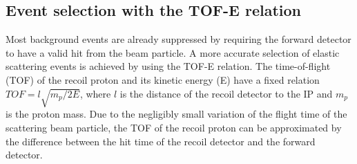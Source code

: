 \documentclass[number,5p]{elsarticle}
\begin{document}
\subsection{Event selection with the TOF-E relation}
\label{sec:tofe_selection}

Most background events are already suppressed by requiring the forward detector to have a valid hit from the beam particle.
A more accurate selection of elastic scattering events is achieved by using the TOF-E relation.
The time-of-flight (TOF) of the recoil proton and its kinetic energy (E)
have a fixed relation $TOF = l\sqrt{m_p/2E}$, where $l$ is the distance of
the recoil detector to the IP and $m_p$ is the proton mass.
Due to the negligibly small variation of the flight time of the scattering beam particle,
the TOF of the recoil proton can be approximated by the difference between the hit time of the recoil detector and the forward detector.
\end{document}
